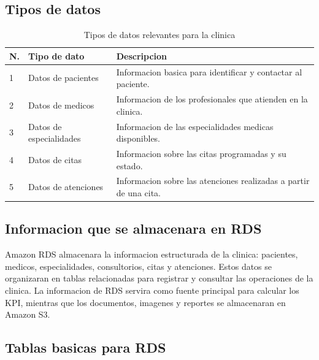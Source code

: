 \documentclass[11pt,letterpaper]{article}
\begin{document}
\subsection{Tipos de datos}

\begin{table}[htbp]
  \centering
  \small
  \caption{Tipos de datos relevantes para la clinica}
  \begin{tabularx}{\textwidth}{@{}C{1.1cm}p{4.2cm}Y@{}}
    \toprule
    \textbf{N.} & \textbf{Tipo de dato} & \textbf{Descripcion} \\
     & Datos de pacientes & Informacion basica para identificar y contactar al paciente. \\
    2 & Datos de medicos & Informacion de los profesionales que atienden en la clinica. \\
    3 & Datos de especialidades & Informacion de las especialidades medicas disponibles. \\
    4 & Datos de citas & Informacion sobre las citas programadas y su estado. \\
    5 & Datos de atenciones & Informacion sobre las atenciones realizadas a partir de una cita. \\
    \bottomrule
  \end{tabularx}
\end{table}

\subsection{Informacion que se almacenara en RDS}

Amazon RDS almacenara la informacion estructurada de la clinica: pacientes, medicos,
especialidades, consultorios, citas y atenciones. Estos datos se organizaran en tablas relacionadas
para registrar y consultar las operaciones de la clinica. La informacion de RDS servira como
fuente principal para calcular los KPI, mientras que los documentos, imagenes y reportes se
almacenaran en Amazon S3.

\subsection{Tablas basicas para RDS}
\end{document}
